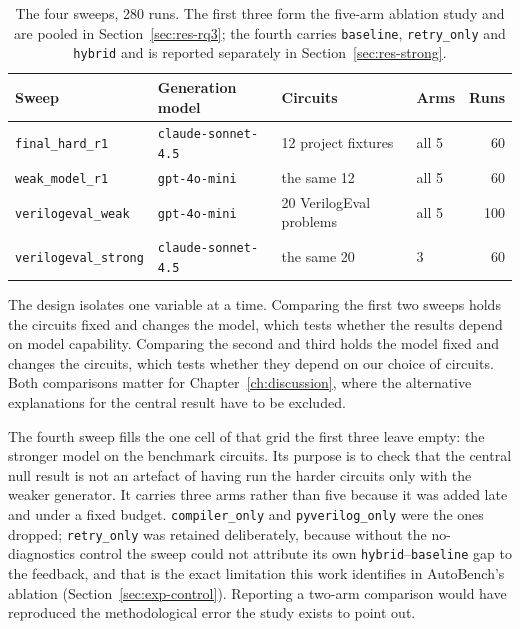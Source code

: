 \documentclass[11pt,a4paper,titlepage=false]{scrreprt}
\begin{document}
\begin{table}[H]
\centering
\small
\begin{tabular}{@{}l l l l r@{}}
\toprule
\textbf{Sweep} & \textbf{Generation model} & \textbf{Circuits} & \textbf{Arms} & \textbf{Runs} \\
\midrule
\texttt{final\_hard\_r1}     & \texttt{claude-sonnet-4.5} & 12 project fixtures & all 5 & 60 \\
\texttt{weak\_model\_r1}     & \texttt{gpt-4o-mini}       & the same 12         & all 5 & 60 \\
\texttt{verilogeval\_weak}   & \texttt{gpt-4o-mini}       & 20 VerilogEval problems & all 5 & 100 \\
\midrule
\texttt{verilogeval\_strong} & \texttt{claude-sonnet-4.5} & the same 20 & 3 & 60 \\
\bottomrule
\end{tabular}
\caption{The four sweeps, 280 runs. The first three form the five-arm ablation study and are
pooled in Section~\ref{sec:res-rq3}; the fourth carries \texttt{baseline},
\texttt{retry\_only} and \texttt{hybrid} and is reported separately in
Section~\ref{sec:res-strong}.}
\label{tab:sweeps}
\end{table}

The design isolates one variable at a time. Comparing the first two sweeps holds the
circuits fixed and changes the model, which tests whether the results depend on model
capability. Comparing the second and third holds the model fixed and changes the circuits,
which tests whether they depend on our choice of circuits. Both comparisons matter for
Chapter~\ref{ch:discussion}, where the alternative explanations for the central result have
to be excluded.

The fourth sweep fills the one cell of that grid the first three leave empty: the stronger
model on the benchmark circuits. Its purpose is to check that the central null result is not
an artefact of having run the harder circuits only with the weaker generator. It carries three arms rather than five because it was added late
and under a fixed budget. \texttt{compiler\_only} and \texttt{pyverilog\_only} were the ones
dropped; \texttt{retry\_only} was retained deliberately, because without the no-diagnostics
control the sweep could not attribute its own \texttt{hybrid}--\texttt{baseline} gap to the
feedback, and that is the exact limitation this work identifies in AutoBench's ablation
(Section~\ref{sec:exp-control}). Reporting a two-arm comparison would have reproduced the
methodological error the study exists to point out.
\end{document}
